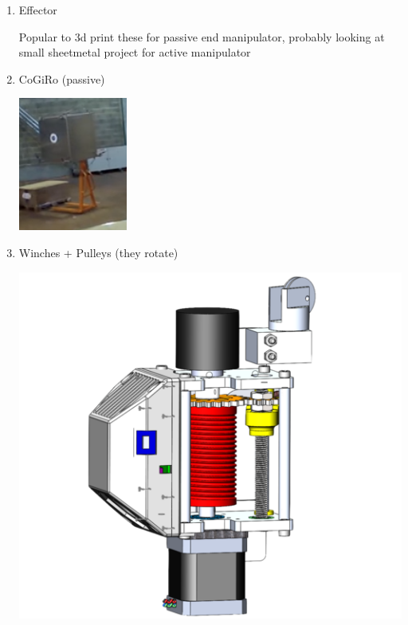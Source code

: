 \documentclass[11pt]{article}
\begin{document}
\begin{enumerate}
\item Effector
\label{sec:org28c9cbf}

Popular to 3d print these for passive end manipulator, probably looking at small sheetmetal project for active manipulator

\item CoGiRo (passive)
\label{sec:org2366bcc}
\begin{center}
\includegraphics[width=.9\linewidth]{Hardware_needed/2022-07-18_13-31-45_screenshot.png}
\end{center}

\item Winches + Pulleys (they rotate)
\label{sec:org8e74d23}

\begin{center}
\includegraphics[width=.9\linewidth]{Hardware_needed/2022-07-18_13-16-45_screenshot.png}
\end{center}


\end{enumerate}
\end{document}

